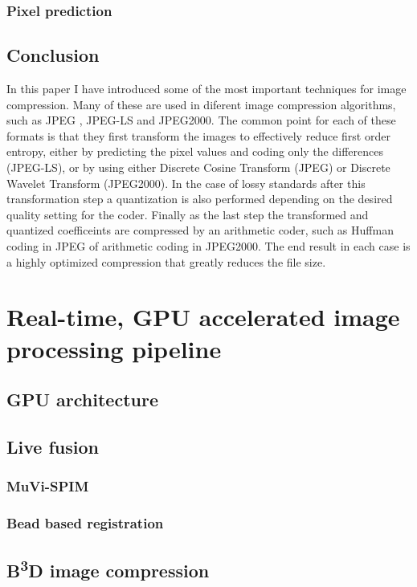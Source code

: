 \documentclass{diploma_style}
\newcommand{\bbbd}{B\textsuperscript{3}D }
\begin{document}
\subsection{Pixel prediction}



\section{Conclusion}
In this paper I have introduced some of the most important techniques for image compression. Many of these are used in diferent image compression algorithms, such as JPEG \cite{pennebaker_jpeg:_1992}, JPEG-LS \cite{weinberger_loco-i_2000} and JPEG2000. The common point for each of these formats is that they first transform the images to effectively reduce first order entropy, either by predicting the pixel values and coding only the differences (JPEG-LS), or by using either Discrete Cosine Transform (JPEG) or Discrete Wavelet Transform (JPEG2000). In the case of lossy standards after this transformation step a quantization is also performed depending on the desired quality setting for the coder. Finally as the last step the transformed and quantized coefficeints are compressed by an arithmetic coder, such as Huffman coding in JPEG of arithmetic coding in JPEG2000. The end result in each case is a highly optimized compression that greatly reduces the file size.




\chapter{Real-time, GPU accelerated image processing pipeline}
\section{GPU architecture}
\section{Live fusion}
	\subsection{MuVi-SPIM}
	\subsection{Bead based registration}
\section{\bbbd image compression}
\end{document}
